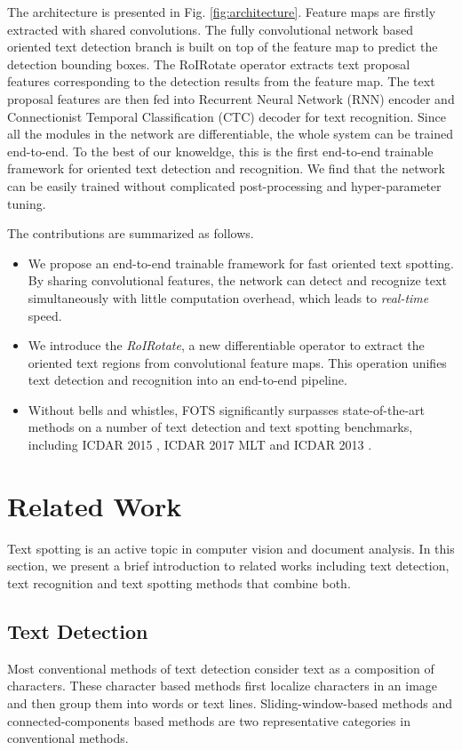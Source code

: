 \documentclass[10pt,twocolumn,letterpaper]{article}
\begin{document}
The architecture is presented in Fig. \ref{fig:architecture}. Feature maps are firstly extracted with shared convolutions. The fully convolutional network based oriented text detection branch is built on top of the feature map to predict the detection bounding boxes. The RoIRotate operator extracts text proposal features corresponding to the detection results from the feature map. The text proposal features are then fed into Recurrent Neural Network (RNN) encoder and Connectionist Temporal Classification (CTC) decoder \cite{graves2006ctc} for text recognition. Since all the modules in the network are differentiable, the whole system can be trained end-to-end. To the best of our knoweldge, this is the first end-to-end trainable framework for oriented text detection and recognition. We find that the network can be easily trained without complicated post-processing and hyper-parameter tuning.


The contributions are summarized as follows.
\begin{itemize}

\item
We propose an end-to-end trainable framework for fast oriented text spotting. By sharing convolutional features, the network can detect and recognize text simultaneously with little computation overhead, which leads to \emph{real-time} speed.

\item
We introduce the \emph{RoIRotate}, a new differentiable operator to extract the oriented text regions from convolutional feature maps. This operation unifies text detection and recognition into an end-to-end pipeline.

\item
Without bells and whistles, FOTS significantly surpasses state-of-the-art methods on a number of text detection and text spotting benchmarks, including ICDAR 2015 \cite{karatzas2015icdar15}, ICDAR 2017 MLT \cite{icdar17} and ICDAR 2013 \cite{karatzas2013icdar}.

\end{itemize}
\section{Related Work}
Text spotting is an active topic in computer vision and document analysis. In this section, we present a brief introduction to related works including text detection, text recognition and text spotting methods that combine both.

\subsection{Text Detection}
Most conventional methods of text detection consider text as a composition of characters. These character based methods first localize characters in an image and then group them into words or text lines. Sliding-window-based methods \cite{jaderberg2014deep,textbasedapproach,Chen2004Detecting,zhu2016text} and connected-components based methods \cite{huang2013text,neumann2013scene,busta2015fastext} are two representative categories in conventional methods.
\end{document}
